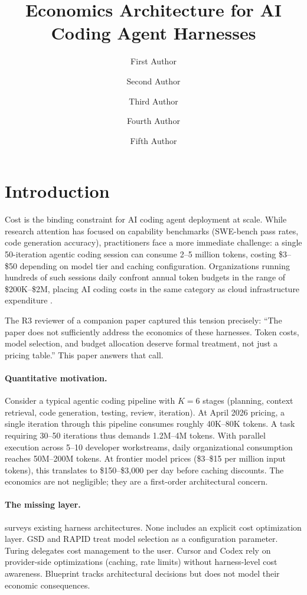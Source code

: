 \documentclass[11pt, a4paper, logo, copyright]{googledeepmind}
\title{Economics Architecture for AI Coding Agent Harnesses}
\author[1]{First Author}
\author[2]{Second Author}
\author[2]{Third Author}
\author[1]{Fourth Author}
\author[1]{Fifth Author}
\affil[]{Pragnition Labs}
\affil[*]{Equal Contribution}
\affil[1]{Affiliation 1}
\affil[2]{Affiliation 2}
\begin{document}
\maketitle

\section{Introduction}\label{sec:intro}

Cost is the binding constraint for AI coding agent deployment at scale. While research attention has focused on capability benchmarks (SWE-bench pass rates, code generation accuracy), practitioners face a more immediate challenge: a single 50-iteration agentic coding session can consume 2--5 million tokens, costing \$3--\$50 depending on model tier and caching configuration. Organizations running hundreds of such sessions daily confront annual token budgets in the range of \$200K--\$2M, placing AI coding costs in the same category as cloud infrastructure expenditure \citep{finops2023}.

The R3 reviewer of a companion paper captured this tension precisely: ``The paper does not sufficiently address the economics of these harnesses. Token costs, model selection, and budget allocation deserve formal treatment, not just a pricing table.'' This paper answers that call.

\paragraph{Quantitative motivation.}
Consider a typical agentic coding pipeline with $K = 6$ stages (planning, context retrieval, code generation, testing, review, iteration). At April 2026 pricing, a single iteration through this pipeline consumes roughly 40K--80K tokens. A task requiring 30--50 iterations thus demands 1.2M--4M tokens. With parallel execution across 5--10 developer workstreams, daily organizational consumption reaches 50M--200M tokens. At frontier model prices (\$3--\$15 per million input tokens), this translates to \$150--\$3,000 per day before caching discounts. The economics are not negligible; they are a first-order architectural concern.

\paragraph{The missing layer.}
 surveys existing harness architectures. None includes an explicit cost optimization layer. GSD and RAPID treat model selection as a configuration parameter. Turing delegates cost management to the user. Cursor and Codex rely on provider-side optimizations (caching, rate limits) without harness-level cost awareness. Blueprint tracks architectural decisions but does not model their economic consequences.
\end{document}
